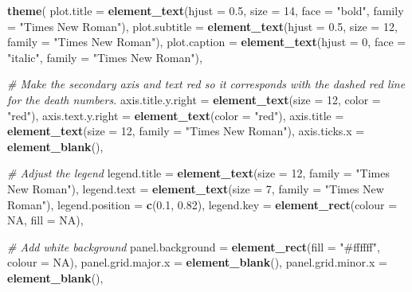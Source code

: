 \documentclass[
]{article}
\newenvironment{Shaded}{\begin{snugshade}}{\end{snugshade}}
\newcommand{\AttributeTok}[1]{\textcolor[rgb]{0.13,0.29,0.53}{#1}}
\newcommand{\CommentTok}[1]{\textcolor[rgb]{0.56,0.35,0.01}{\textit{#1}}}
\newcommand{\ConstantTok}[1]{\textcolor[rgb]{0.56,0.35,0.01}{#1}}
\newcommand{\DecValTok}[1]{\textcolor[rgb]{0.00,0.00,0.81}{#1}}
\newcommand{\FloatTok}[1]{\textcolor[rgb]{0.00,0.00,0.81}{#1}}
\newcommand{\FunctionTok}[1]{\textcolor[rgb]{0.13,0.29,0.53}{\textbf{#1}}}
\newcommand{\NormalTok}[1]{#1}
\newcommand{\StringTok}[1]{\textcolor[rgb]{0.31,0.60,0.02}{#1}}
\begin{document}
\begin{Shaded}
\begin{Highlighting}[]
  \FunctionTok{theme}\NormalTok{(}
    \AttributeTok{plot.title =} \FunctionTok{element\_text}\NormalTok{(}\AttributeTok{hjust =} \FloatTok{0.5}\NormalTok{, }\AttributeTok{size =} \DecValTok{14}\NormalTok{, }\AttributeTok{face =} \StringTok{"bold"}\NormalTok{, }\AttributeTok{family =} \StringTok{"Times New Roman"}\NormalTok{),}
    \AttributeTok{plot.subtitle =} \FunctionTok{element\_text}\NormalTok{(}\AttributeTok{hjust =} \FloatTok{0.5}\NormalTok{, }\AttributeTok{size =} \DecValTok{12}\NormalTok{, }\AttributeTok{family =} \StringTok{"Times New Roman"}\NormalTok{),}
    \AttributeTok{plot.caption =} \FunctionTok{element\_text}\NormalTok{(}\AttributeTok{hjust =} \DecValTok{0}\NormalTok{, }\AttributeTok{face =} \StringTok{"italic"}\NormalTok{, }\AttributeTok{family =} \StringTok{"Times New Roman"}\NormalTok{), }
    
    
    \CommentTok{\# Make the secondary axis and text red so it corresponds with the dashed red line for the death numbers. }
    \AttributeTok{axis.title.y.right =} \FunctionTok{element\_text}\NormalTok{(}\AttributeTok{size =} \DecValTok{12}\NormalTok{, }\AttributeTok{color =} \StringTok{"red"}\NormalTok{),  }
    \AttributeTok{axis.text.y.right =} \FunctionTok{element\_text}\NormalTok{(}\AttributeTok{color =} \StringTok{"red"}\NormalTok{),}
    \AttributeTok{axis.title =} \FunctionTok{element\_text}\NormalTok{(}\AttributeTok{size =} \DecValTok{12}\NormalTok{, }\AttributeTok{family =} \StringTok{"Times New Roman"}\NormalTok{),}
    \AttributeTok{axis.ticks.x =} \FunctionTok{element\_blank}\NormalTok{(),}
    
    \CommentTok{\# Adjust the legend}
    \AttributeTok{legend.title =} \FunctionTok{element\_text}\NormalTok{(}\AttributeTok{size =} \DecValTok{12}\NormalTok{, }\AttributeTok{family =} \StringTok{"Times New Roman"}\NormalTok{),}
    \AttributeTok{legend.text =} \FunctionTok{element\_text}\NormalTok{(}\AttributeTok{size =} \DecValTok{7}\NormalTok{, }\AttributeTok{family =} \StringTok{"Times New Roman"}\NormalTok{),}
    \AttributeTok{legend.position =} \FunctionTok{c}\NormalTok{(}\FloatTok{0.1}\NormalTok{, }\FloatTok{0.82}\NormalTok{),}
    \AttributeTok{legend.key =} \FunctionTok{element\_rect}\NormalTok{(}\AttributeTok{colour =} \ConstantTok{NA}\NormalTok{, }\AttributeTok{fill =} \ConstantTok{NA}\NormalTok{),}
    
    
   \CommentTok{\# Add white background}
    \AttributeTok{panel.background =} \FunctionTok{element\_rect}\NormalTok{(}\AttributeTok{fill =} \StringTok{"\#ffffff"}\NormalTok{, }\AttributeTok{colour =} \ConstantTok{NA}\NormalTok{),}
    \AttributeTok{panel.grid.major.x =} \FunctionTok{element\_blank}\NormalTok{(),}
    \AttributeTok{panel.grid.minor.x =} \FunctionTok{element\_blank}\NormalTok{(),}
   

\end{Highlighting}
\end{Shaded}
\end{document}
